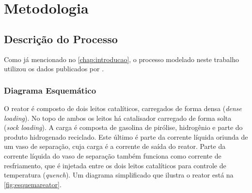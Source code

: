 %
\chapter{Metodologia}
\label{chap:metodologia}

\section{Descrição do Processo} \label{sec:descricaoprocesso}

Como já mencionado no \autoref{chap:introducao}, o processo modelado
neste trabalho utilizou os dados publicados por . 

\subsection{Diagrama Esquemático} \label{sec:diagramaesquematico}

O reator é composto de dois leitos catalíticos, carregados de forma densa
(\emph{dense loading}). No topo de ambos os leitos há catalisador carregado de
forma solta (\emph{sock loading}). A carga é composta de gasolina de pirólise,
hidrogênio e parte do produto hidrogenado reciclado. Este último é parte da
corrente líquida oriunda de um vaso de separação, cuja carga é a corrente de
saída do reator. Parte da corrente líquida do vaso de separação também
funciona como corrente de resfriamento, que é injetada entre os dois leitos
catalíticos para controle de temperatura (\emph{quench}). Um diagrama
simplificado que ilustra o reator está na \autoref{fig:esquemareator}. 


